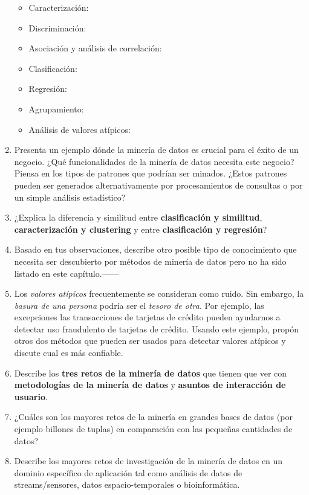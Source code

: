 \documentclass{article}
\begin{document}
\begin{enumerate}
\begin{itemize}
    \item Caracterización:
    \item Discriminación:
    \item Asociación y análisis de correlación:
    \item Clasificación:
    \item Regresión:
    \item Agrupamiento:
    \item Análisis de valores atípicos:
\end{itemize}

\pagebreak
\item Presenta un ejemplo dónde la minería de datos es crucial para el éxito de
un negocio. ¿Qué funcionalidades de la minería de datos necesita este negocio?
Piensa en los tipos de patrones que podrían ser minados. ¿Estos patrones pueden
ser generados alternativamente por procesamientos de consultas o por un simple
análisis estadístico?

\pagebreak
\item ¿Explica la diferencia y similitud entre \textbf{clasificación y
similitud}, \textbf{caracterización y clustering} y entre \textbf{clasificación
y regresión}?

\pagebreak
\item Basado en tus observaciones, describe otro posible tipo de conocimiento
que necesita ser descubierto por métodos de minería de datos pero no ha sido
listado en este capítulo.------

\pagebreak
\item Los \textit{valores atípicos} frecuentemente se consideran como ruido. Sin
embargo, la \textit{basura de una persona} podría ser el \textit{tesoro de
otra}. Por ejemplo, las excepciones las transacciones de tarjetas de crédito
pueden ayudarnos a detectar uso fraudulento de tarjetas de crédito. Usando este
ejemplo, propón otros dos métodos que pueden ser usados para detectar valores
atípicos y discute cual es más confiable.

\pagebreak
\item Describe los \textbf{tres retos de la minería de datos} que tienen que ver
con \textbf{metodologías de la minería de datos} y \textbf{asuntos de
interacción de usuario}.

\pagebreak
\item ¿Cuáles son los mayores retos de la minería en grandes bases de datos (por
ejemplo billones de tuplas) en comparación con las pequeñas cantidades de datos?

\pagebreak
\item Describe los mayores retos de investigación de la minería de datos en un
dominio específico de aplicación tal como análisis de datos de streams/sensores,
datos espacio-temporales o bioinformática.

\end{enumerate}
\end{document}
